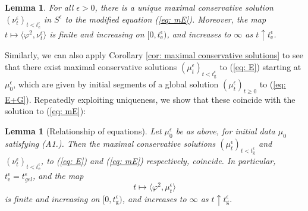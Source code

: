 \documentclass[11pt, notitlepage]{article}
\newtheorem{lem}[thm]{Lemma}
\begin{document}
\begin{lem}\label{lemma: solution to modified equation}
    For all $\epsilon>0$, there is a unique maximal conservative solution  $(\nu^\epsilon_t)_{t< t_\mathrm{e}^\epsilon}$ in $S^\epsilon$ to the modified equation (\ref{eq: mE}). Moreover, the map $t\mapsto \langle \varphi^2, \nu^\epsilon_t\rangle$ is finite and increasing on $[0,t_\mathrm{e}^\epsilon)$, and increases to $\infty$ as $t\uparrow t_\mathrm{e}^\epsilon$. 
\end{lem}

Similarly, we can also apply Corollary \ref{cor: maximal conservative solutions} to see that there exist maximal conservative solutions $(\mu^\epsilon_t)_{t<t_\mathrm{g}^\epsilon}$ to (\ref{eq: E}) starting at $\mu^\epsilon_0$, which are given by initial segments of a global solution $(\mu^\epsilon_t)_{t\geq 0}$ to (\ref{eq: E+G}). Repeatedly exploiting uniqueness, we show that these coincide with the solution to (\ref{eq: mE}):

\begin{lem}[Relationship of equations]\label{lemma: Relationship}
Let $\mu^\epsilon_0$ be as above, for initial data $\mu_0$ satisfying ({A1}.).  Then the maximal conservative solutions $(\mu^\epsilon_t)_{t<t_\mathrm{g}^\epsilon}$ and $(\nu^\epsilon_t)_{t<t_\mathrm{e}^\epsilon}$, to (\ref{eq: E}) and (\ref{eq: mE}) respectively, coincide. In particular, $t_\mathrm{e}^\epsilon = t^\epsilon_{gel}$, and the map \begin{equation}
    t\mapsto \langle \varphi^2, \mu^\epsilon_t\rangle
\end{equation} is finite and increasing on $[0, t_\mathrm{g}^\epsilon)$, and increases to $\infty$ as $t\uparrow t_\mathrm{g}^\epsilon.$ \end{lem}
\end{document}
